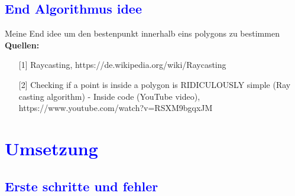 \documentclass{article}
\begin{document}
\subsection{\textcolor{blue}{End Algorithmus idee}}
Meine End idee um den bestenpunkt innerhalb eins polygons zu bestimmen
\\
\Large{\textbf{Quellen:}}
\begin{itemize}
\item[\normalsize{[1]}] \normalsize{Raycasting, https://de.wikipedia.org/wiki/Raycasting}
\item[\normalsize{[2]}] \normalsize{Checking if a point is inside a polygon is RIDICULOUSLY simple (Ray casting algorithm) - Inside code (YouTube video), https://www.youtube.com/watch?v=RSXM9bgqxJM}
\end{itemize}
\section{\textcolor{blue}{Umsetzung}}
\subsection{\textcolor{blue}{Erste schritte und fehler}}
\end{document}
